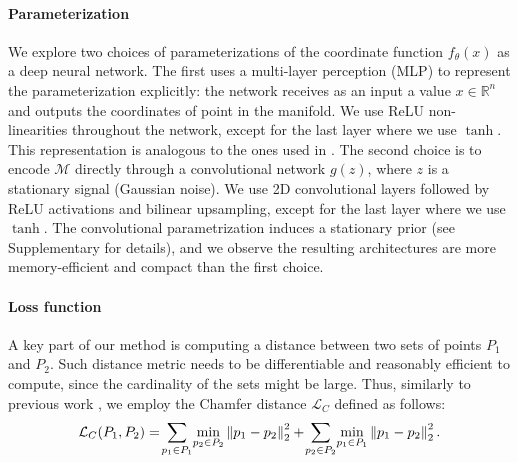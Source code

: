 \paragraph*{Parameterization}
We explore two choices of parameterizations of the coordinate function $f_\theta(x)$ as
a deep neural network.
The first uses a multi-layer perception (MLP) to represent the parameterization explicitly:
the network receives as an input a value $x \in \mathbb{R}^n$ and outputs the coordinates of point
in the manifold.
We use ReLU non-linearities throughout the network, except for the last layer where we
use $\tanh$.
This representation is analogous to the ones used in \cite{atlasnet,yang2018foldingnet}.
The second choice is to encode $\mathcal{M}$ directly through a
convolutional network $g(z)$, where $z$ is a stationary signal
(Gaussian noise).
We use 2D convolutional layers followed by ReLU
activations and bilinear upsampling, except for the last layer where
we use $\tanh$.
The convolutional parametrization induces a stationary prior (see Supplementary for details), and we observe the resulting architectures are more memory-efficient and compact than the first choice.

\paragraph*{Loss function}
A key part of our method is computing a distance between two sets of points $P_1$ and $P_2$.
Such distance metric needs to be differentiable and reasonably efficient to compute, since the cardinality of the sets might be large.
Thus, similarly to previous work \cite{atlasnet,yang2018foldingnet,pixel2mesh,mrt18}, we employ the Chamfer distance $\mathcal{L}_C$ defined as follows:
\begin{equation}
\label{eq:chamfer}
    \mathcal{L}_C(P_1, P_2)= \!\sum_{p_1 \in P_1}\! \min_{p_2 \in P_2 }\left\lVert p_1 - p_2\right\rVert_2^2 +\!
                   \sum_{p_2 \in P_2}\! \min_{p_1 \in P_1 }\left\lVert p_1 - p_2\right\rVert_2^2. \nonumber
\end{equation}

